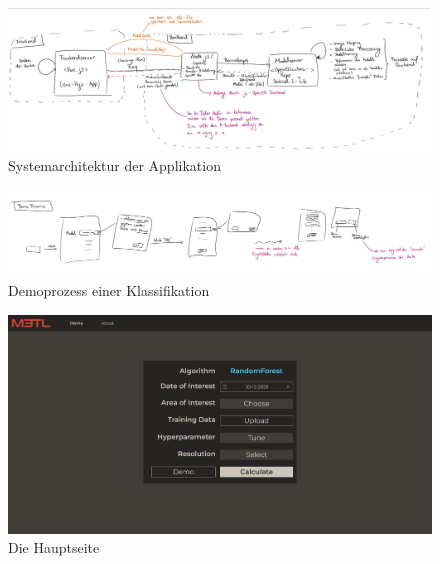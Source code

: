 


\begin{landscape}
\thispagestyle{empty}
  \begin{figure}[H]
  \centering
  \includegraphics[scale=0.8]{Abbildungen/Serverarchitektur.JPG}
  \caption{Systemarchitektur der Applikation}
  \label{fig:systemarchitecture}
\end{figure}
\end{landscape}


\begin{landscape}
\thispagestyle{empty}
  \begin{figure}[H]
  \centering
  \includegraphics[scale=0.8]{Abbildungen/Demoprozess.JPG}
  \caption{Demoprozess einer Klassifikation}
  \label{fig:demoprocess}
\end{figure}
\end{landscape}

\begin{landscape}
\thispagestyle{empty}
    \begin{figure}[H]
    \centering
    \includegraphics[scale=0.5]{Abbildungen/web-home.png}
    \caption{Die Hauptseite}
    \label{fig:homepage}
\end{figure}
\end{landscape}

